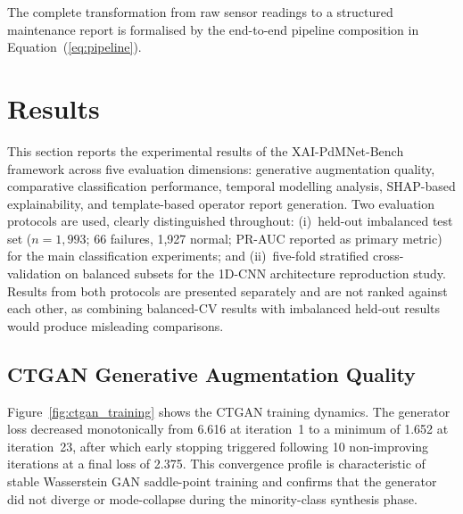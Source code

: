 \documentclass[sensors,article,submit,pdftex,moreauthors]{Definitions/mdpi}
\begin{document}
The complete transformation from raw sensor readings to a
structured maintenance report is formalised by the end-to-end
pipeline composition in Equation~(\ref{eq:pipeline}).

\section{Results}
\label{sec:results}

This section reports the experimental results of the XAI-PdMNet-Bench
framework across five evaluation dimensions: generative augmentation
quality, comparative classification performance, temporal modelling
analysis, SHAP-based explainability, and template-based operator report
generation.
Two evaluation protocols are used, clearly distinguished throughout:
(i)~held-out imbalanced test set ($n = 1{,}993$; 66 failures, 1{,}927
normal; PR-AUC reported as primary metric) for the main classification
experiments; and (ii)~five-fold stratified cross-validation on balanced
subsets for the 1D-CNN architecture reproduction study.
Results from both protocols are presented separately and are not
ranked against each other, as combining balanced-CV results with
imbalanced held-out results would produce misleading comparisons.

\subsection{CTGAN Generative Augmentation Quality}

Figure~\ref{fig:ctgan_training} shows the CTGAN training dynamics.
The generator loss decreased monotonically from 6.616 at iteration~1
to a minimum of 1.652 at iteration~23, after which early stopping
triggered following 10 non-improving iterations at a final loss of
2.375.
This convergence profile is characteristic of stable Wasserstein GAN
saddle-point training and confirms that the generator did not
diverge or mode-collapse during the minority-class synthesis phase.
\end{document}
